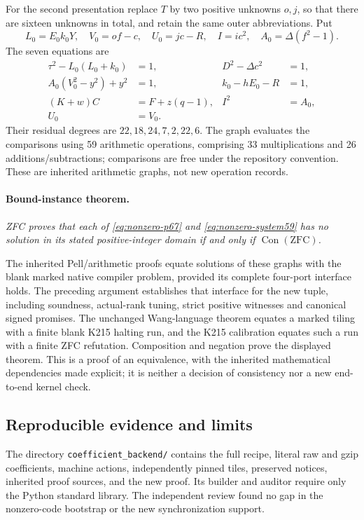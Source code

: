 For the second presentation replace $T$ by two positive unknowns $o,j$,
so that there are sixteen unknowns in total, and retain the same outer
abbreviations.  Put
\[
 L_0=E_0k_0Y,\quad V_0=of-c,\quad U_0=jc-R,
 \quad I=ic^2,\quad A_0=\Delta(f^2-1).
\]
The seven equations are
\begin{equation}
\begin{aligned}
 \tau^2-L_0(L_0+k_0)&=1,& D^2-\Delta c^2&=1,\\
 A_0(V_0^2-y^2)+y^2&=1,& k_0-hE_0-R&=1,\\
 (K+w)C&=F+z(q-1),& I^2&=A_0,\\
 U_0&=V_0.&&
\end{aligned}
\label{eq:nonzero-system59}
\end{equation}
Their residual degrees are $22,18,24,7,2,22,6$.  The graph evaluates
the comparisons using 59 arithmetic operations, comprising 33
multiplications and 26 additions/subtractions; comparisons are free
under the repository convention.  These are inherited arithmetic
graphs, not new operation records.

\paragraph{Bound-instance theorem.}
\emph{ZFC proves that each of
\eqref{eq:nonzero-p67} and \eqref{eq:nonzero-system59} has no solution
in its stated positive-integer domain if and only if $\operatorname{Con}(\mathrm{ZFC})$.}

The inherited Pell/arithmetic proofs equate solutions of these graphs
with the blank marked native compiler problem, provided its complete
four-port interface holds.  The preceding argument establishes that
interface for the new tuple, including soundness, actual-rank tuning,
strict positive witnesses and canonical signed promises.  The unchanged
Wang-language theorem equates a marked tiling with a finite blank K215
halting run, and the K215 calibration equates such a run with a finite
ZFC refutation.  Composition and negation prove the displayed theorem.
This is a proof of an equivalence, with the inherited mathematical
dependencies made explicit; it is neither a decision of consistency nor
a new end-to-end kernel check.

\subsection{Reproducible evidence and limits}

The directory \texttt{coefficient\_backend/} contains the full recipe,
literal raw and gzip coefficients, machine actions, independently pinned
tiles, preserved notices, inherited proof sources, and the new proof.
Its builder and auditor require only the Python standard library.
The independent review found no gap in the nonzero-code bootstrap or
the new synchronization support.

